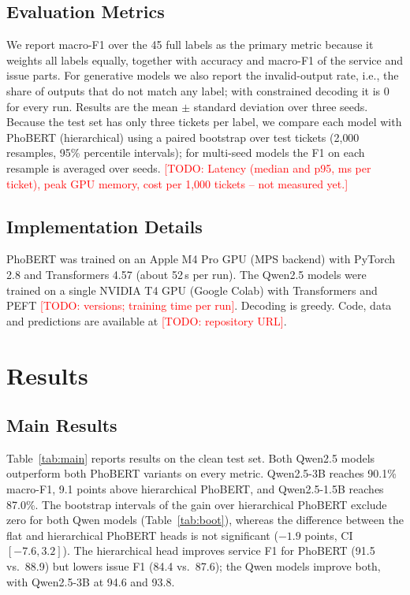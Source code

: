\documentclass[conference]{IEEEtran}
\newcommand{\TODO}[1]{\textcolor{red}{[TODO: #1]}}
\begin{document}
\subsection{Evaluation Metrics}
We report macro-F1 over the 45 full labels as the primary metric because it
weights all labels equally, together with accuracy and macro-F1 of the
service and issue parts. For generative models we also report the
invalid-output rate, i.e., the share of outputs that do not match any label;
with constrained decoding it is 0 for every run. Results are the mean
$\pm$ standard deviation over three seeds. Because the test set has only
three tickets per label, we compare each model with PhoBERT (hierarchical)
using a paired bootstrap over test tickets \cite{efron1993bootstrap}
(2{,}000 resamples, 95\% percentile intervals); for multi-seed models the
F1 on each resample is averaged over seeds.
\TODO{Latency (median and p95, ms per ticket), peak GPU memory, cost per
1{,}000 tickets -- not measured yet.}

\subsection{Implementation Details}
PhoBERT was trained on an Apple M4 Pro GPU (MPS backend) with PyTorch 2.8
and Transformers 4.57 (about 52\,s per run). The Qwen2.5 models were trained
on a single NVIDIA T4 GPU (Google Colab) with Transformers and PEFT
\TODO{versions; training time per run}. Decoding is greedy. Code, data and
predictions are available at \TODO{repository URL}.

\section{Results}
\label{sec:results}

\subsection{Main Results}
Table~\ref{tab:main} reports results on the clean test set. Both Qwen2.5
models outperform both PhoBERT variants on every metric. Qwen2.5-3B reaches
90.1\% macro-F1, 9.1 points above hierarchical PhoBERT, and Qwen2.5-1.5B
reaches 87.0\%. The bootstrap intervals of the gain over hierarchical
PhoBERT exclude zero for both Qwen models (Table~\ref{tab:boot}), whereas
the difference between the flat and hierarchical PhoBERT heads is not
significant ($-1.9$ points, CI $[-7.6, 3.2]$). The hierarchical head
improves service F1 for PhoBERT (91.5 vs.\ 88.9) but lowers issue F1
(84.4 vs.\ 87.6); the Qwen models improve both, with Qwen2.5-3B at 94.6 and
93.8.
\end{document}
